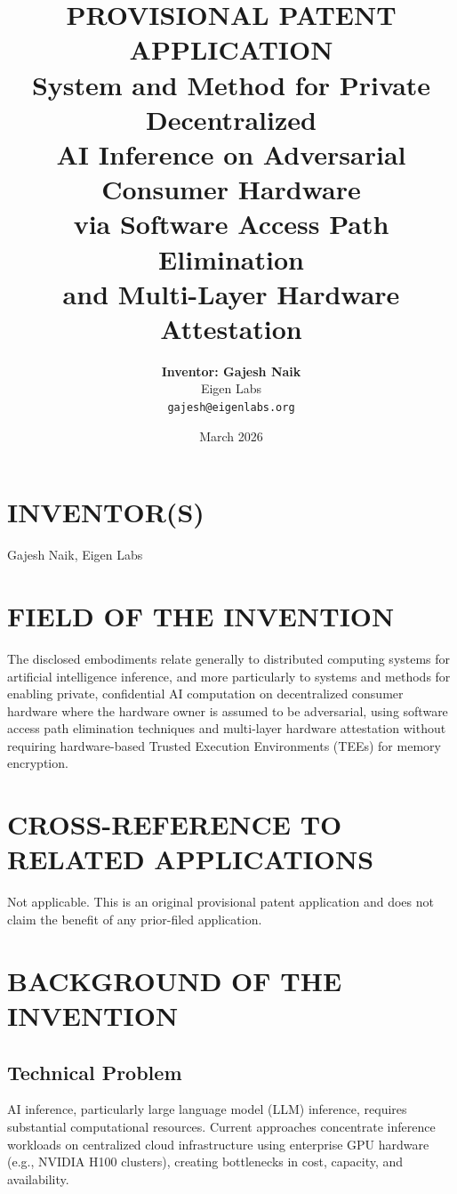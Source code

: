 \documentclass[11pt,letterpaper]{article}
\title{%
\vspace{-0.5cm}
{\LARGE\sffamily\bfseries PROVISIONAL PATENT APPLICATION}\\[12pt]
{\Large\sffamily System and Method for Private Decentralized\\
AI Inference on Adversarial Consumer Hardware\\
via Software Access Path Elimination\\
and Multi-Layer Hardware Attestation}
}
\author{
    \textbf{Inventor: Gajesh Naik} \\[4pt]
    {\small Eigen Labs} \\[2pt]
    {\small\texttt{gajesh@eigenlabs.org}}
}
\date{\small March 2026}
\begin{document}
\maketitle
\thispagestyle{fancy}

\section*{INVENTOR(S)}

Gajesh Naik, Eigen Labs

\section{FIELD OF THE INVENTION}

The disclosed embodiments relate generally to distributed computing systems for artificial intelligence inference, and more particularly to systems and methods for enabling private, confidential AI computation on decentralized consumer hardware where the hardware owner is assumed to be adversarial, using software access path elimination techniques and multi-layer hardware attestation without requiring hardware-based Trusted Execution Environments (TEEs) for memory encryption.

\section{CROSS-REFERENCE TO RELATED APPLICATIONS}

Not applicable. This is an original provisional patent application and does not claim the benefit of any prior-filed application.

\section{BACKGROUND OF THE INVENTION}

\subsection{Technical Problem}

AI inference, particularly large language model (LLM) inference, requires substantial computational resources. Current approaches concentrate inference workloads on centralized cloud infrastructure using enterprise GPU hardware (e.g., NVIDIA H100 clusters), creating bottlenecks in cost, capacity, and availability.
\end{document}
